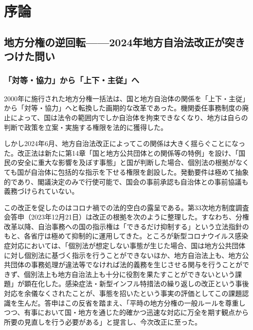 
\chapter{序論}
\label{chap:introduction}

\section{地方分権の逆回転——2024年地方自治法改正が突きつけた問い}
\label{sec:intro_problem}

\subsection{「対等・協力」から「上下・主従」へ}
\label{subsec:intro_local_gov_law}

2000年に施行された地方分権一括法は、国と地方自治体の関係を「上下・主従」から「対等・協力」へと転換した画期的な改革であった\cite{chihobunken1999}。機関委任事務制度の廃止によって、国は法令の範囲内でしか自治体を拘束できなくなり、地方は自らの判断で政策を立案・実施する権限を法的に獲得した。

しかし2024年6月、地方自治法改正によってこの関係は大きく揺らぐことになった\cite{chihojichiho2024}。改正法は新たに第14章「国と地方公共団体との関係等の特例」を設け、「国民の安全に重大な影響を及ぼす事態」と国が判断した場合、個別法の根拠がなくても国が自治体に包括的な指示を下せる権限を創設した。発動要件は極めて抽象的であり、閣議決定のみで行使可能で、国会の事前承認も自治体との事前協議も義務づけられていない\cite{jichiken2024chihojichiho}。

この改正を促したのはコロナ禍での法的空白の露呈である。第33次地方制度調査会答申（2023年12月21日）は改正の根拠を次のように整理した\cite{chihoseido33}。すなわち、分権改革以降、自治事務への国の指示権は「できるだけ抑制する」という立法指針のもと、各省庁は極めて抑制的に運用してきた。ところが新型コロナウイルス感染症対応においては、「個別法が想定しない事態が生じた場合、国は地方公共団体に対し個別法に基づく指示を行うことができないほか、地方自治法上も、地方公共団体の事務処理が違法等でなければ法的義務を生じさせる関与を行うことができず、個別法上も地方自治法上も十分に役割を果たすことができないという課題」が顕在化した。感染症法・新型インフル特措法の繰り返しの改正という事後対応を余儀なくされたことが、事態を招いたという事実の評価としてこの課題認識を生んだ。答申はこの反省を踏まえ、「平時の地方分権の一般ルールを尊重しつつ、有事において国・地方を通じた的確かつ迅速な対応に万全を期す観点から所要の見直しを行う必要がある」と提言し、今次改正に至った。

